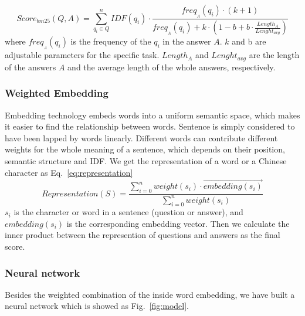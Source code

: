 \documentclass{llncs}
\begin{document}
\begin{equation}
Score_{bm25}(Q,A)=\sum_{q_i \in Q}^nIDF(q_i)\cdot \frac{freq_{_A}(q_i)\cdot(k+1)}{freq_{_A}(q_i) + k \cdot (1-b +b\cdot \frac{Length_A}{Lenght_{avg}})}  
\label{eq:bm25}
\end{equation}
where $freq_{_A}(q_i)$ is the frequency of the $q_i$ in the answer $A$. $k$ and b are adjustable parameters for the specific task. $Length_A$ and $Lenght_{avg}$ are the length of the answers $A$ and the average length of the whole answers, respectively.

\subsubsection{Weighted Embedding}
\label{sec:embedding}
Embedding technology embeds words into a uniform semantic space, which makes it easier to find the relationship between words. Sentence is simply considered to have been lapped by words linearly. Different words can contribute different weights for the whole meaning of a sentence, which depends on their position, semantic structure and IDF.
We get the representation of a word or a Chinese character as Eq.~\ref{eq:representation}
\begin{equation}
Representation(S) = \frac{\sum_{i=0}^n weight(s_i)\cdot \overrightarrow { embedding(s_i)} }{\sum_{i=0}^n weight(s_i) }
\label{eq:representation}
\end{equation}
$s_i$ is the character or word in a sentence (question or answer), and $embedding(s_i)$ is the corresponding embedding vector. Then we calculate the inner product between the represention of questions and answers as the final score.

\subsubsection{Neural network}
Besides the weighted combination of the inside word embedding, we have built a neural network which is showed as Fig.~\ref{fig:model}. 
\end{document}
